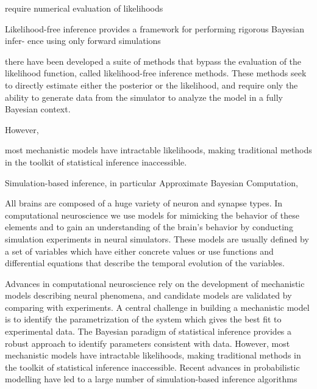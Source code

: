 

require numerical evaluation of likelihoods

Likelihood-free inference provides a framework for performing rigorous Bayesian infer- ence using only forward simulations

there have been developed a suite of methods that bypass the evaluation of the likelihood function, called likelihood-free inference methods. These methods seek to directly estimate either the posterior or the likelihood, and require only the ability to generate data from the simulator to analyze the model in a fully Bayesian context.


However, 

most mechanistic models have intractable likelihoods, making traditional methods in the toolkit of statistical inference inaccessible.

Simulation-based inference, in particular Approximate Bayesian Computation,


All brains are composed of a huge variety of neuron and synapse types. In computational neuroscience we use models for mimicking the behavior of these elements and to gain an understanding of the brain's behavior by conducting simulation experiments in neural simulators. These models are usually defined by a set of variables which have either concrete values or use functions and differential equations that describe the temporal evolution of the variables.

Advances in computational neuroscience rely on the development of mechanistic models describing neural phenomena, and candidate models are validated by comparing with experiments. A central challenge in building a mechanistic model is to identify the parametrization of the system which gives the best fit to experimental data. The Bayesian paradigm of statistical inference provides a robust approach to identify parameters consistent with data. However, most mechanistic models have intractable likelihoods, making traditional methods in the toolkit of statistical inference inaccessible. Recent advances in probabilistic modelling have led to a large number of simulation-based inference algorithms 

